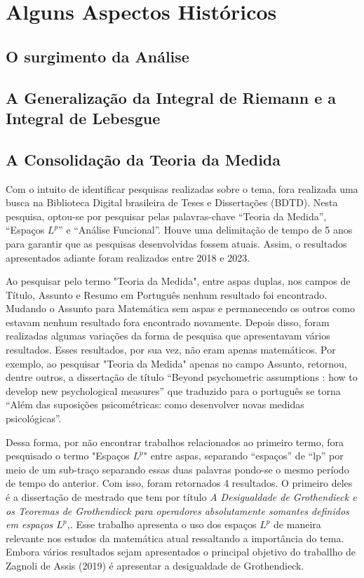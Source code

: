 \chapter{Alguns Aspectos Históricos}

\section{O surgimento da Análise}
\section{A Generalização da Integral de Riemann e a Integral de Lebesgue}
\section{A Consolidação da Teoria da Medida}
Com o intuito de identificar pesquisas realizadas sobre o tema, fora realizada uma busca na Biblioteca Digital brasileira de Teses e Dissertações (BDTD).
Nesta pesquisa, optou-se por pesquisar pelas palavras-chave \enquote{Teoria da Medida}, \enquote{Espaços $L^p$} e \enquote{Análise Funcional}. 
Houve uma delimitação de tempo de 5 anos para garantir que as pesquisas desenvolvidas fossem atuais. Assim, o resultados apresentados adiante foram realizados entre 2018 e 2023.

Ao pesquisar pelo termo "Teoria da Medida", entre aspas duplas, nos campos de Título, Assunto e Resumo em Português nenhum resultado foi encontrado. 
Mudando o Assunto para Matemática sem aspas e permanecendo os outros como estavam nenhum resultado fora encontrado novamente.
Depois disso, foram realizadas algumas variações da forma de pesquisa que apresentavam vários resultados. 
Esses resultados, por sua vez, não eram apenas matemáticos.
Por exemplo, ao pesquisar "Teoria da Medida" apenas no campo Assunto, retornou, dentre outros,  a dissertação de título 	
\enquote{Beyond psychometric assumptions : how to develop new psychological measures} que traduzido para o português se torna 
\enquote{Além das suposições psicométricas: como desenvolver novas medidas psicológicas}. 

Dessa forma, por não encontrar trabalhos relacionados ao primeiro termo, fora pesquisado o termo "Espaços $L^p$"  entre aspas, separando \enquote{espaços} de \enquote{lp} por meio de um sub-traço separando essas duas palavras pondo-se o mesmo período de tempo do anterior. 
Com isso, foram retornados 4 resultados. 
O primeiro deles é a dissertação de mestrado que tem por título \textit{A Desigualdade de Grothendieck e os Teoremas de Grothendieck para operadores absolutamente somantes definidos em espaços $L^p$,}. Esse trabalho apresenta o uso dos espaços $L^p$ de maneira relevante nos estudos da matemática atual ressaltando a importância do tema.
Embora vários resultados sejam apresentados o principal objetivo do traballho de Zagnoli de Assis (2019) é apresentar a desigualdade de Grothendieck.

